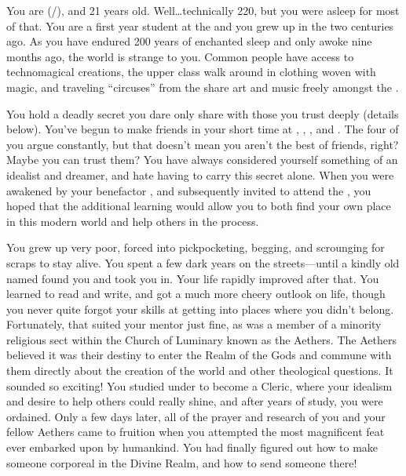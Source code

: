\documentclass[char]{GL2020}
\begin{document}
\name{\cDisney{}}


You are \cDisney{\full} (\cDisney{\they}/\cDisney{\them}), and 21 years old. Well\ldots{}technically 220, but you were asleep for most of that. You are a first year student at the \pSchool{} and you grew up in the \pFarm{} two centuries ago. As you have endured 200 years of enchanted sleep and only awoke nine months ago, the world is strange to you. Common people have access to technomagical creations, the upper class walk around in clothing woven with magic, and traveling ``circuses'' from the \pTech{} share art and music freely amongst the \pFarmers{}.

You hold a deadly secret you dare only share with those you trust deeply (details below). You've begun to make friends in your short time at \pSchool{}, \cPirateChild{\full}, \cTechStar{\full}, and \cAdopted{\full}. The four of you argue constantly, but that doesn't mean you aren't the best of friends, right? Maybe you can trust them? You have always considered yourself something of an idealist and dreamer, and hate having to carry this secret alone. When you were awakened by your benefactor \cWildCard{\full}, and subsequently invited to attend the \pSchool{}, you hoped that the additional learning would allow you to both find your own place in this modern world and help others in the process.

You grew up very poor, forced into pickpocketing, begging, and scrounging for scraps to stay alive. You spent a few dark years on the streets---until a kindly old \cDisneyMentor{\cleric} named \cDisneyMentor{} found you and took you in. Your life rapidly improved after that. You learned to read and write, and got a much more cheery outlook on life, though you never quite forgot your skills at getting into places where you didn't belong. Fortunately, that suited your mentor just fine, as \cDisneyMentor{\they} was a member of a minority religious sect within the Church of Luminary known as the Aethers. The Aethers believed it was their destiny to enter the Realm of the Gods and commune with them directly about the creation of the world and other theological questions. It sounded so exciting! You studied under \cDisneyMentor{} to become a Cleric, where your idealism and desire to help others could really shine, and after years of study, you were ordained. Only a few days later, all of the prayer and research of you and your fellow Aethers came to fruition when you attempted the most magnificent feat ever embarked upon by humankind. You had finally figured out how to make someone corporeal in the Divine Realm, and how to send someone there!
\end{document}
